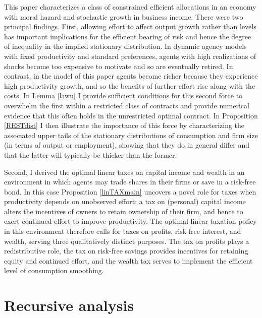 \documentclass[11pt]{article}
\theoremstyle{plain}
\begin{document}
This paper characterizes a class of constrained efficient allocations in an economy with moral hazard and stochastic growth in business income. There were two principal findings. First, allowing effort to affect output growth rather than levels has important implications for the efficient bearing of risk and hence the degree of inequality in the implied stationary distribution. In dynamic agency models with fixed productivity and standard preferences, agents with high realizations of shocks become too expensive to motivate and so are eventually retired. In contrast, in the model of this paper agents become richer because they experience high productivity growth, and so the benefits of further effort rise along with the costs. In Lemma \ref{lawu} I provide sufficient conditions for this second force to overwhelm the first within a restricted class of contracts and provide numerical evidence that this often holds in the unrestricted optimal contract. In Proposition \ref{RESTdist} I then illustrate the importance of this force by characterizing the associated upper tails of the stationary distributions of consumption and firm size (in terms of output or employment), showing that they do in general differ and that the latter will typically be thicker than the former. 

Second, I derived the optimal linear taxes on capital income and wealth in an environment in which agents may trade shares in their firms or save in a risk-free bond. In this case Proposition \ref{linTAXmain} uncovers a novel role for taxes when productivity depends on unobserved effort: a tax on (personal) capital income alters the incentives of owners to retain ownership of their firm, and hence to exert continued effort to improve productivity. The optimal linear taxation policy in this environment therefore calls for taxes on profits, risk-free interest, and wealth, serving three qualitatively distinct purposes. The tax on profits plays a redistributive role, the tax on risk-free savings provides incentives for retaining equity and continued effort, and the wealth tax serves to implement the efficient level of consumption smoothing.




\appendix

\small

\listoffigures

\section{Recursive analysis}\label{recursiveAPP}
\end{document}
